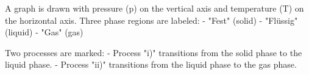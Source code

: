 A graph is drawn with pressure (p) on the vertical axis and temperature (T) on the horizontal axis. Three phase regions are labeled:  
- "Fest" (solid)  
- "Flüssig" (liquid)  
- "Gas" (gas)  

Two processes are marked:  
- Process "i)" transitions from the solid phase to the liquid phase.  
- Process "ii)" transitions from the liquid phase to the gas phase.